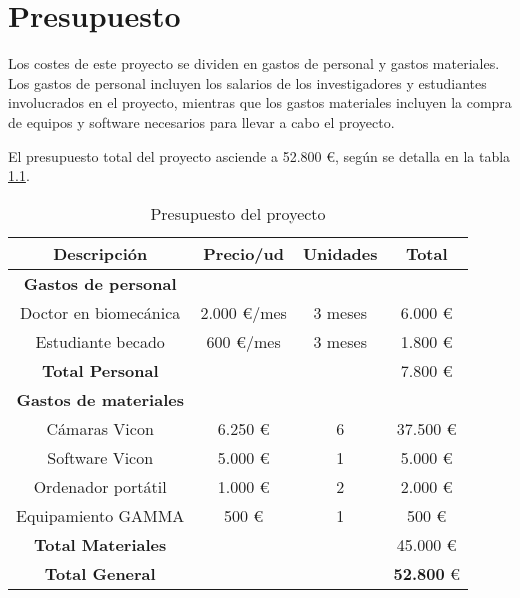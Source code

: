 \chapter{Presupuesto} \label{sec:cap4}

\noindent Los costes de este proyecto se dividen en gastos de personal y gastos materiales. Los gastos de personal incluyen los salarios de los investigadores y estudiantes involucrados en el proyecto, mientras que los gastos materiales incluyen la compra de equipos y software necesarios para llevar a cabo el proyecto.

El presupuesto total del proyecto asciende a 52.800 €, según se detalla en la tabla \ref{tab:presupuesto}.

\begin{table}[H]
    \centering
    \begin{tabular}{cccc}
    \toprule
    {\textbf{Descripción}} & {\textbf{Precio/ud}} & {\textbf{Unidades}} & {\textbf{Total}} \\
    \midrule
    \textbf{Gastos de personal} & & & \\
    Doctor en biomecánica & 2.000 €/mes & 3 meses & 6.000 € \\
    Estudiante becado & 600 €/mes & 3 meses & 1.800 € \\
    \hline
    \textbf{Total Personal} & & & 7.800 € \\
    \hline
    \textbf{Gastos de materiales} & & & \\
    Cámaras Vicon & 6.250 € & 6 & 37.500 € \\
    Software Vicon & 5.000 € & 1 & 5.000 € \\
    Ordenador portátil & 1.000 € & 2 & 2.000 € \\
    Equipamiento \ac{GAMMA} & 500 € & 1 & 500 € \\
    \hline
    \textbf{Total Materiales} & & & 45.000 € \\
    \hline
    \textbf{Total General} & & & \textbf{52.800} € \\
    \bottomrule
    \end{tabular}
    \caption{Presupuesto del proyecto}
    \label{tab:presupuesto}
  \end{table}
